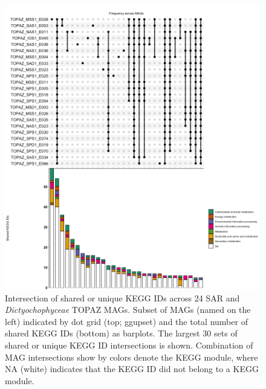 \documentclass[12pt]{article}
\numberwithin{equation}{section}
\begin{document}
\begin{figure}
    \centering
    \includegraphics[width=0.95\columnwidth]{si-figures/SI-SAR-Dictyocho-MAG-KEGG-intersection.png}
    \caption{Intersection of shared or unique KEGG IDs across 24 SAR and \textit{Dictyochophyceae} TOPAZ MAGs. Subset of MAGs (named on the left) indicated by dot grid (top; ggupset) and the total number of shared KEGG IDs (bottom) as barplots. The largest 30 sets of shared or unique KEGG ID intersections is shown. Combination of MAG intersections show by colors denote the KEGG module, where NA (white) indicates that the KEGG ID did not belong to a KEGG module. }
        \label{fig:dictyocho-SAR-intersect}
\end{figure}
\end{document}
